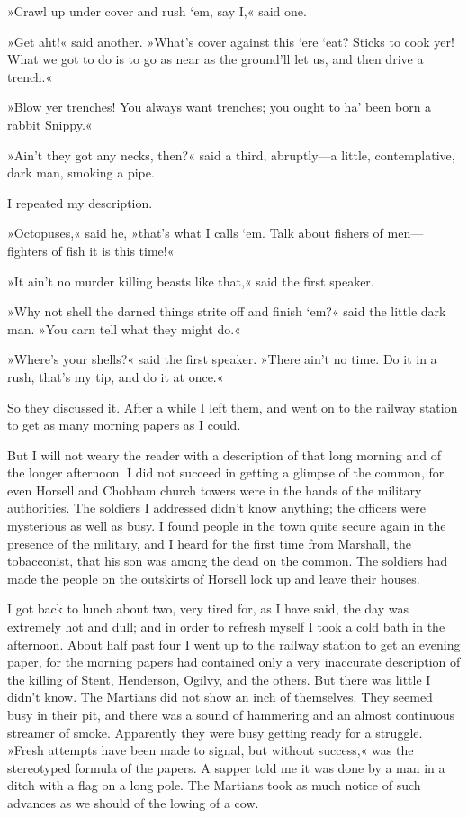 »Crawl up under cover and rush `em, say I,« said one.

»Get aht!« said another. »What's cover against this `ere `eat? Sticks to cook yer! What we got to do is to go as near as the ground'll let us, and then drive a trench.«

»Blow yer trenches! You always want trenches; you ought to ha' been born a rabbit Snippy.«

»Ain't they got any necks, then?« said a third, abruptly—a little, contemplative, dark man, smoking a pipe.

I repeated my description.

»Octopuses,« said he, »that's what I calls `em. Talk about fishers of men—fighters of fish it is this time!«

»It ain't no murder killing beasts like that,« said the first speaker.

»Why not shell the darned things strite off and finish `em?« said the little dark man. »You carn tell what they might do.«

»Where's your shells?« said the first speaker. »There ain't no time. Do it in a rush, that's my tip, and do it at once.«

So they discussed it. After a while I left them, and went on to the railway station to get as many morning papers as I could.

But I will not weary the reader with a description of that long morning and of the longer afternoon. I did not succeed in getting a glimpse of the common, for even Horsell and Chobham church towers were in the hands of the military authorities. The soldiers I addressed didn't know anything; the officers were mysterious as well as busy. I found people in the town quite secure again in the presence of the military, and I heard for the first time from Marshall, the tobacconist, that his son was among the dead on the common. The soldiers had made the people on the outskirts of Horsell lock up and leave their houses.

I got back to lunch about two, very tired for, as I have said, the day was extremely hot and dull; and in order to refresh myself I took a cold bath in the afternoon. About half past four I went up to the railway station to get an evening paper, for the morning papers had contained only a very inaccurate description of the killing of Stent, Henderson, Ogilvy, and the others. But there was little I didn't know. The Martians did not show an inch of themselves. They seemed busy in their pit, and there was a sound of hammering and an almost continuous streamer of smoke. Apparently they were busy getting ready for a struggle. »Fresh attempts have been made to signal, but without success,« was the stereotyped formula of the papers. A sapper told me it was done by a man in a ditch with a flag on a long pole. The Martians took as much notice of such advances as we should of the lowing of a cow.

